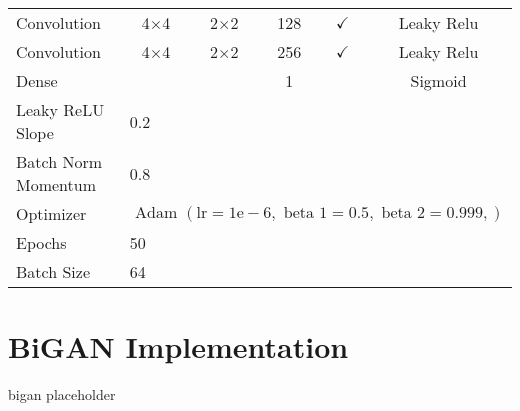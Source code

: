 \begin{table}[]
{\begin{tabular}{llcccc}
			Convolution & \multicolumn{1}{c}{4$\times$4} & 2$\times$2 & 128 & $\checkmark$ & Leaky Relu \\
			Convolution & \multicolumn{1}{c}{4$\times$4} & 2$\times$2 & 256 & $\checkmark$ & Leaky Relu \\
			Dense & \multicolumn{1}{c}{} &  & 1 &  & Sigmoid \\ \hline
			Leaky ReLU Slope & \multicolumn{5}{l}{0.2} \\
			Batch Norm Momentum & \multicolumn{5}{l}{0.8} \\
			Optimizer & \multicolumn{5}{l}{$\text { Adam }(\mathrm{lr}=1 \mathrm{e}-6, \text { beta } 1=0.5, \text { beta } 2=0.999,)$} \\ \hline
			Epochs & 50 & \multicolumn{1}{l}{} & \multicolumn{1}{l}{} & \multicolumn{1}{l}{} & \multicolumn{1}{l}{} \\
			Batch Size & \multicolumn{5}{l}{64}
		\end{tabular}%
	}
\end{table}

\section{BiGAN Implementation}

bigan placeholder

